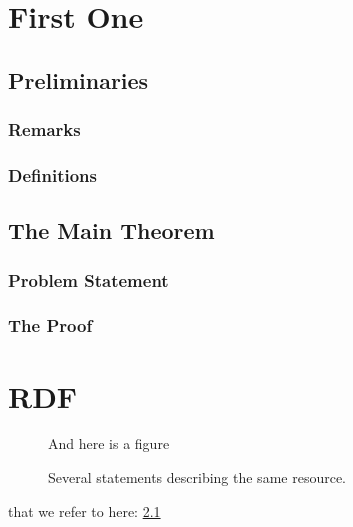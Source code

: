 \documentclass[a4paper,11pt]{kth-mag}
\begin{document}
\chapter{First One}



\section{Preliminaries}


\subsection{Remarks}



\subsection{Definitions}



\section{The Main Theorem}



\subsection{Problem Statement}



\subsection{The Proof}



\appendix
\addappheadtotoc
\chapter{RDF}\label{appA}

\begin{figure}[ht]
\begin{center}
And here is a figure
\caption{\small{Several statements describing the same resource.}}\label{RDF_4}
\end{center}
\end{figure}

that we refer to here: \ref{RDF_4}
\end{document}
